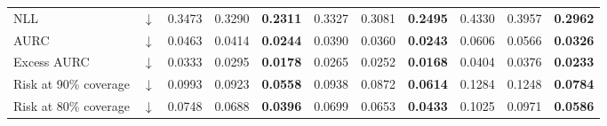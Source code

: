 \begin{table}[t]
\begin{tabular}{l c *{3}{ccc}}
NLL & $\downarrow$ & 0.3473 & 0.3290 & \textbf{0.2311} & 0.3327 & 0.3081 & \textbf{0.2495} & 0.4330 & 0.3957 & \textbf{0.2962} \\
AURC & $\downarrow$ & 0.0463 & 0.0414 & \textbf{0.0244} & 0.0390 & 0.0360 & \textbf{0.0243} & 0.0606 & 0.0566 & \textbf{0.0326} \\
Excess AURC & $\downarrow$ & 0.0333 & 0.0295 & \textbf{0.0178} & 0.0265 & 0.0252 & \textbf{0.0168} & 0.0404 & 0.0376 & \textbf{0.0233} \\
Risk at 90\% coverage & $\downarrow$ & 0.0993 & 0.0923 & \textbf{0.0558} & 0.0938 & 0.0872 & \textbf{0.0614} & 0.1284 & 0.1248 & \textbf{0.0784} \\
Risk at 80\% coverage & $\downarrow$ & 0.0748 & 0.0688 & \textbf{0.0396} & 0.0699 & 0.0653 & \textbf{0.0433} & 0.1025 & 0.0971 & \textbf{0.0586} \\
\bottomrule
\end{tabular}
\end{table}
